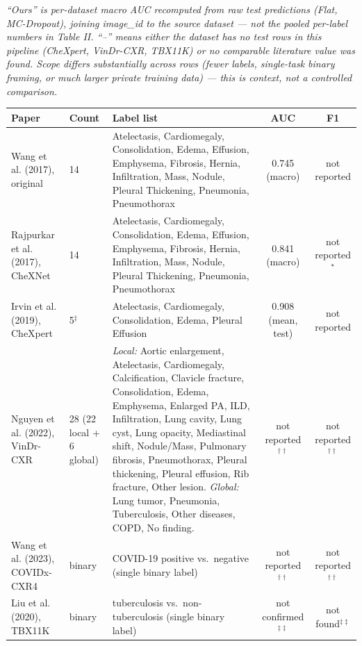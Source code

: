 \documentclass[a4paper,11pt]{article}
\begin{document}
\vspace{4pt}
\footnotesize\textit{``Ours'' is per-dataset macro AUC recomputed from raw test predictions (Flat, MC-Dropout), joining image\_id to the source dataset --- not the pooled per-label numbers in Table II. ``--'' means either the dataset has no test rows in this pipeline (CheXpert, VinDr-CXR, TBX11K) or no comparable literature value was found. Scope differs substantially across rows (fewer labels, single-task binary framing, or much larger private training data) --- this is context, not a controlled comparison.}

\vspace{24pt}

\begin{center}
\label{tab:f1-availability}

\footnotesize
\renewcommand{\arraystretch}{1.4}
\setlength{\tabcolsep}{4pt}
\begin{tabular}{p{2.6cm} p{1.7cm} p{4.6cm} c c}
\toprule
Paper & Count & Label list & AUC & F1 \\
\midrule
Wang et al. (2017), original & 14 & Atelectasis, Cardiomegaly, Consolidation, Edema, Effusion, Emphysema, Fibrosis, Hernia, Infiltration, Mass, Nodule, Pleural Thickening, Pneumonia, Pneumothorax & 0.745 (macro) & not reported \\
Rajpurkar et al. (2017), CheXNet & 14 & Atelectasis, Cardiomegaly, Consolidation, Edema, Effusion, Emphysema, Fibrosis, Hernia, Infiltration, Mass, Nodule, Pleural Thickening, Pneumonia, Pneumothorax & 0.841 (macro) & not reported$^{*}$ \\
Irvin et al. (2019), CheXpert & 5$^\ddagger$ & Atelectasis, Cardiomegaly, Consolidation, Edema, Pleural Effusion & 0.908 (mean, test) & not reported \\
Nguyen et al. (2022), VinDr-CXR & 28 (22 local + 6 global) & \textit{Local:} Aortic enlargement, Atelectasis, Cardiomegaly, Calcification, Clavicle fracture, Consolidation, Edema, Emphysema, Enlarged PA, ILD, Infiltration, Lung cavity, Lung cyst, Lung opacity, Mediastinal shift, Nodule/Mass, Pulmonary fibrosis, Pneumothorax, Pleural thickening, Pleural effusion, Rib fracture, Other lesion. \textit{Global:} Lung tumor, Pneumonia, Tuberculosis, Other diseases, COPD, No finding. & not reported$^{\dagger\dagger}$ & not reported$^{\dagger\dagger}$ \\
Wang et al. (2023), COVIDx-CXR4 & binary & COVID-19 positive vs.\ negative (single binary label) & not reported$^{\dagger\dagger}$ & not reported$^{\dagger\dagger}$ \\
Liu et al. (2020), TBX11K & binary & tuberculosis vs.\ non-tuberculosis (single binary label) & not confirmed$^{\ddagger\ddagger}$ & not found$^{\ddagger\ddagger}$ \\
\bottomrule
\end{tabular}
\end{center}
\end{document}
